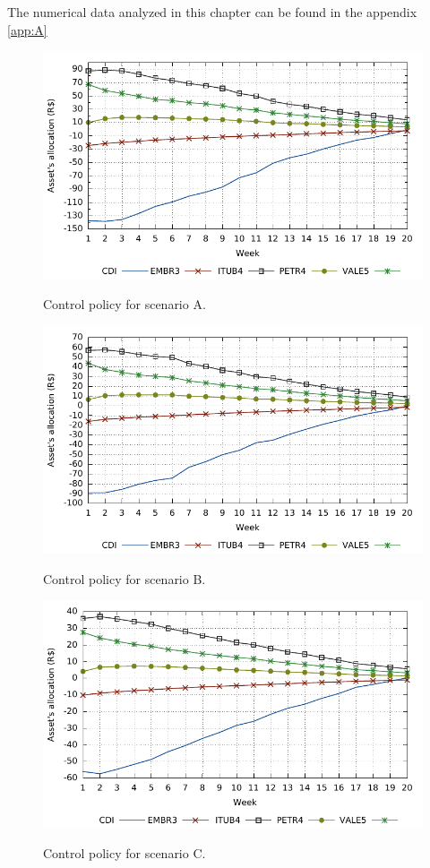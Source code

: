 The numerical data analyzed in this chapter can be found in the appendix \ref{app:A}
%
\begin{figure} [H]
	\caption{Control policy for scenario A.}
	\centering	
	\includegraphics[width=6in,keepaspectratio]{figures/u_A}
	\label{fig:u1}
\end{figure}
%
\begin{figure} [H]
	\caption{Control policy for scenario B.}
	\centering
	\includegraphics[width=6in,keepaspectratio]{figures/u_B}
	\label{fig:u2}
\end{figure}
%
\begin{figure} [H]
	\caption{Control policy for scenario C.}
	\centering
	\includegraphics[width=6in,keepaspectratio]{figures/u_C}
	\label{fig:u3}
\end{figure}

